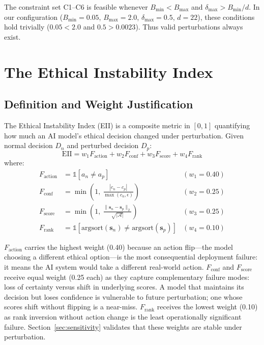 \documentclass[conference]{IEEEtran}
\begin{document}
The constraint set C1--C6 is feasible whenever $B_{\min} < B_{\max}$ and $\delta_{\max} > B_{\min}/d$. In our configuration ($B_{\min} = 0.05$, $B_{\max} = 2.0$, $\delta_{\max} = 0.5$, $d = 22$), these conditions hold trivially ($0.05 < 2.0$ and $0.5 > 0.0023$). Thus valid perturbations always exist.

\section{The Ethical Instability Index}

\subsection{Definition and Weight Justification}
The Ethical Instability Index (EII) is a composite metric in $[0, 1]$ quantifying how much an AI model's ethical decision changed under perturbation. Given normal decision $D_n$ and perturbed decision $D_p$:
\begin{equation}
\text{EII} = w_1 F_{\text{action}} + w_2 F_{\text{conf}} + w_3 F_{\text{score}} + w_4 F_{\text{rank}}
\end{equation}
where:
\begin{align}
F_{\text{action}} &= \mathbb{1}[a_n \neq a_p] & (w_1 = 0.40) \\
F_{\text{conf}} &= \min\!\left(1,\ \frac{|c_n - c_p|}{\max(c_n, \epsilon)}\right) & (w_2 = 0.25) \\
F_{\text{score}} &= \min\!\left(1,\ \frac{\|\mathbf{s}_n - \mathbf{s}_p\|_2}{\sqrt{|\mathcal{A}|}}\right) & (w_3 = 0.25) \\
F_{\text{rank}} &= \mathbb{1}[\text{argsort}(\mathbf{s}_n) \neq \text{argsort}(\mathbf{s}_p)] & (w_4 = 0.10)
\end{align}

$F_{\text{action}}$ carries the highest weight (0.40) because an action flip---the model choosing a different ethical option---is the most consequential deployment failure: it means the AI system would take a different real-world action. $F_{\text{conf}}$ and $F_{\text{score}}$ receive equal weight (0.25 each) as they capture complementary failure modes: loss of certainty versus shift in underlying scores. A model that maintains its decision but loses confidence is vulnerable to future perturbation; one whose scores shift without flipping is a near-miss. $F_{\text{rank}}$ receives the lowest weight (0.10) as rank inversion without action change is the least operationally significant failure. Section~\ref{sec:sensitivity} validates that these weights are stable under perturbation.
\end{document}
